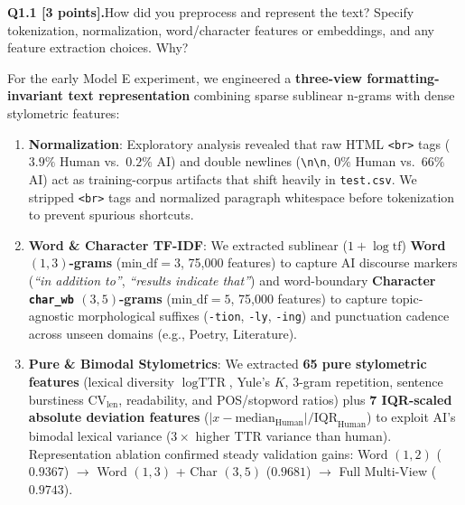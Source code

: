 \documentclass[11pt,letterpaper]{article}
\newcommand{\question}[2]{\needspace{4\baselineskip}\par\addvspace{0.45em}\noindent\textbf{#1}\quad #2\par\nobreak\vspace{0.1em}}
\begin{document}
\question{Q1.1 [3 points].}{How did you preprocess and represent the text? Specify tokenization, normalization, word/character features or embeddings, and any feature extraction choices. Why?}
For the early Model E experiment, we engineered a \textbf{three-view formatting-invariant text representation} combining sparse sublinear n-grams with dense stylometric features:
\begin{enumerate}[leftmargin=*,itemsep=1pt,topsep=2pt]
    \item \textbf{Normalization}: Exploratory analysis revealed that raw HTML \texttt{<br>} tags ($3.9\%$ Human vs.\ $0.2\%$ AI) and double newlines (\texttt{\textbackslash n\textbackslash n}, $0\%$ Human vs.\ $66\%$ AI) act as training-corpus artifacts that shift heavily in \texttt{test.csv}. We stripped \texttt{<br>} tags and normalized paragraph whitespace before tokenization to prevent spurious shortcuts.
    \item \textbf{Word \& Character TF-IDF}: We extracted sublinear ($1+\log\text{tf}$) \textbf{Word $(1,3)$-grams} ($\text{min\_df}=3$, 75,000 features) to capture AI discourse markers (\textit{``in addition to''}, \textit{``results indicate that''}) and word-boundary \textbf{Character \texttt{char\_wb} $(3,5)$-grams} ($\text{min\_df}=5$, 75,000 features) to capture topic-agnostic morphological suffixes (\texttt{-tion}, \texttt{-ly}, \texttt{-ing}) and punctuation cadence across unseen domains (e.g., Poetry, Literature).
    \item \textbf{Pure \& Bimodal Stylometrics}: We extracted \textbf{65 pure stylometric features} (lexical diversity $\log\text{TTR}$, Yule's $K$, 3-gram repetition, sentence burstiness $\text{CV}_{\text{len}}$, readability, and POS/stopword ratios) plus \textbf{7 IQR-scaled absolute deviation features} ($|x - \text{median}_{\text{Human}}| / \text{IQR}_{\text{Human}}$) to exploit AI's bimodal lexical variance ($3\times$ higher TTR variance than human). Representation ablation confirmed steady validation gains: Word $(1,2)$ ($0.9367$) $\to$ Word $(1,3)$ + Char $(3,5)$ ($0.9681$) $\to$ Full Multi-View ($0.9743$).
\end{enumerate}
\end{document}

